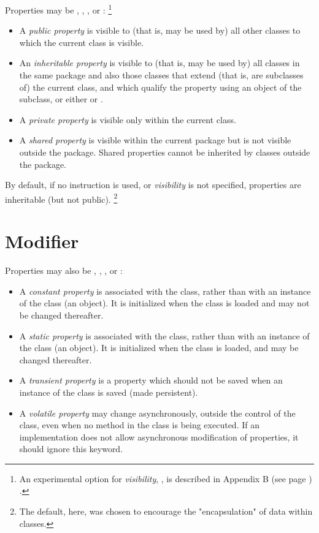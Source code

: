 Properties may be , ,
, or :
\footnote{
An experimental option for \emph{visibility}, ,
is described in  Appendix B (see page \pageref{refappb}) .
}
\begin{itemize}
\item A \emph{public property} is visible to (that is, may be used by)
all other classes to which the current class is visible.
\item An \emph{inheritable property} is visible to (that is, may be used
by) all classes in the same package and also those classes that extend
(that is, are subclasses of) the current class, and which qualify the
property using an object of the subclass, or either 
or .
\item A \emph{private property} is visible only within the current
class.
\item 
A \emph{shared property} is visible within the current package
but is not visible outside the package.  Shared properties cannot be
inherited by classes outside the package.
\end{itemize}
 
By default, if no  instruction is used,
or \emph{visibility} is not specified, properties
are inheritable (but not public).
\footnote{
The default, here, was chosen to encourage the "encapsulation" of
data within classes.
}
\section{Modifier}\label{refpropmod}
 
Properties may also be , ,
, or :
\begin{itemize}
\item 
A \emph{constant property} is associated with the class, rather
than with an instance of the class (an object).
It is initialized when the class is loaded and may not be changed
thereafter.
\item 
A \emph{static property} is associated with the class, rather
than with an instance of the class (an object).
It is initialized when the class is loaded, and may be changed
thereafter.
\item 
A \emph{transient property} is a property which should not be saved when
an instance of the class is saved (made persistent).
\item 
A \emph{volatile property} may change asynchronously, outside the
control of the class, even when no method in the class is being
executed.
If an implementation does not allow asynchronous modification of
properties, it should ignore this keyword.
\end{itemize}
 
